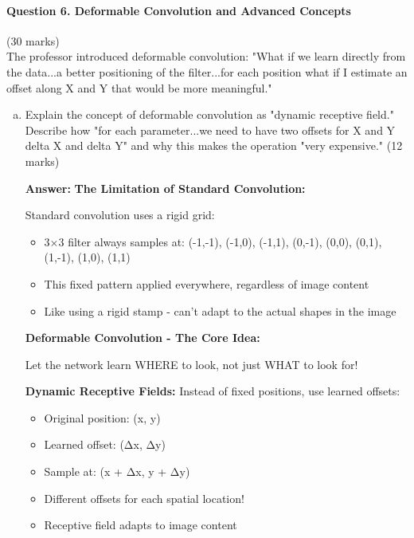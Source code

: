 \documentclass[12pt]{article}
\newcommand{\answer}[1]{{\color{answercolor}\textbf{Answer:} #1}}
\newcommand{\explanation}[1]{{\color{explanationcolor}#1}}
\begin{document}
\newpage
\paragraph{Question 6. Deformable Convolution and Advanced Concepts}{\hfill (30 marks)}\\
The professor introduced deformable convolution: "What if we learn directly from the data...a better positioning of the filter...for each position what if I estimate an offset along X and Y that would be more meaningful."

\begin{enumerate}[(a)]
    \item Explain the concept of deformable convolution as "dynamic receptive field." Describe how "for each parameter...we need to have two offsets for X and Y delta X and delta Y" and why this makes the operation "very expensive." \hfill (12 marks)
    
    \answer{
    \textbf{The Limitation of Standard Convolution:}
    
    \explanation{
    Standard convolution uses a rigid grid:
    \begin{itemize}
        \item 3×3 filter always samples at: (-1,-1), (-1,0), (-1,1), (0,-1), (0,0), (0,1), (1,-1), (1,0), (1,1)
        \item This fixed pattern applied everywhere, regardless of image content
        \item Like using a rigid stamp - can't adapt to the actual shapes in the image
    \end{itemize}
    }
    
    \textbf{Deformable Convolution - The Core Idea:}
    
    \explanation{
    Let the network learn WHERE to look, not just WHAT to look for!
    
    \textbf{Dynamic Receptive Fields:}
    Instead of fixed positions, use learned offsets:
    \begin{itemize}
        \item Original position: (x, y)
        \item Learned offset: (Δx, Δy)
        \item Sample at: (x + Δx, y + Δy)
        \item Different offsets for each spatial location!
        \item Receptive field adapts to image content
    \end{itemize}
    }
    
}
\end{enumerate}
\end{document}
